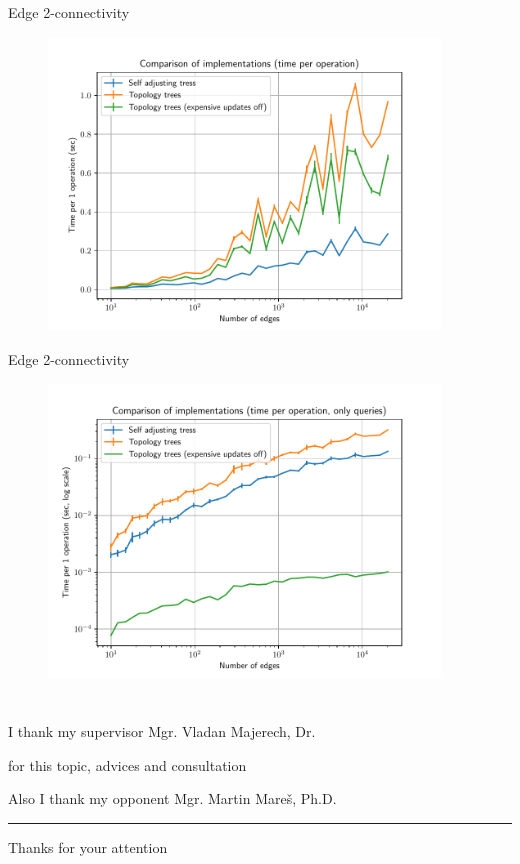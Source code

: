 \documentclass{beamer}				%
\begin{document}
\begin{frame}{Edge 2-connectivity}
	\vskip -3mm
	\begin{figure}
	\centering
	\includegraphics[width=10.4cm]{../charts/double_edge_connectivity_op.pdf}
	\end{figure}
\end{frame}

\begin{frame}{Edge 2-connectivity}
	\vskip -3mm
	\begin{figure}
	\centering
	\includegraphics[width=10.4cm]{../charts/double_edge_connectivity_op_queries.pdf}
	\end{figure}
\end{frame}


\section*{}
\begin{frame}{}

\centerline{I thank my supervisor Mgr. Vladan Majerech, Dr.}
\centerline{for this topic, advices and consultation}

\bigskip\bigskip

\centerline{Also I thank my opponent Mgr. Martin Mareš, Ph.D.}

\pause
\bigskip\hrule
\vfill
{\Large\centerline{Thanks for your attention}}
\vfill
\end{frame}
\end{document}
